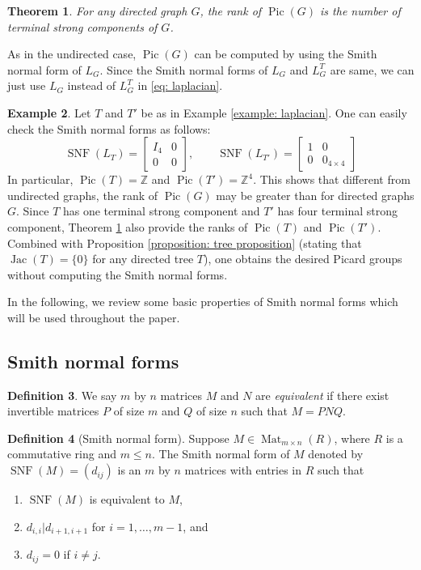\documentclass[11pt,reqno]{amsart}
\DeclareMathOperator{\Pic}{Pic}
\DeclareMathOperator{\Jac}{Jac}
\DeclareMathOperator{\snf}{SNF}
\theoremstyle{definition}
\newtheorem{mydef}{Definition}[section]
\newtheorem{myeg}[mydef]{Example}
\theoremstyle{plain}
\newtheorem{mytheorem}[mydef]{Theorem}
\begin{document}
\begin{mytheorem}\cite[Corollary 3.5]{wagner2000critical} \label{theorem: wagner}
For any directed graph $G$, the rank of $\Pic(G)$ is the number of terminal strong components of $G$. 	
\end{mytheorem}


As in the undirected case, $\Pic(G)$ can be computed by using the Smith normal form of $L_G$. Since the Smith normal forms of $L_G$ and $L_G^T$ are same, we can just use $L_G$ instead of $L_G^T$ in \eqref{eq: laplacian}. 

\begin{myeg}
Let $T$ and $T'$ be as in Example \ref{example: laplacian}. One can easily check the Smith normal forms as follows:
\[
\snf(L_T)=\left[\begin{array}{c|c}
	I_4 & 0 \\ \hline
	0 & 0
\end{array}\right], \qquad \snf(L_{T'})=\left[\begin{array}{c|c}
1 & 0 \\ \hline
0 & 0_{4\times 4}
\end{array}\right]
\]
In particular, $\Pic(T)=\mathbb{Z}$ and $\Pic(T')=\mathbb{Z}^4$. This shows that different from undirected graphs, the rank of $\Pic(G)$ may be greater than for directed graphs $G$. Since $T$ has one terminal strong component and $T'$ has four terminal strong component, Theorem \ref{theorem: wagner} also provide the ranks of $\Pic(T)$ and $\Pic(T')$. Combined with Proposition \ref{proposition: tree proposition} (stating that $\Jac(T)=\{0\}$ for any directed tree $T$), one obtains the desired Picard groups without computing the Smith normal forms. 
\end{myeg}

In the following, we review some basic properties of Smith normal forms which will be used throughout the paper.  


\subsection{Smith normal forms}


\begin{mydef}
We say $m$ by $n$ matrices $M$ and $N$ are \textit{equivalent} if there exist invertible matrices $P$ of size $m$ and $Q$ of size $n$ such that $M = PNQ$.
\end{mydef}

\begin{mydef}[Smith normal form]
Suppose $M \in \operatorname{Mat}_{m \times n}(R)$, where $R$ is a commutative ring and $m \le n$.
The Smith normal form of $M$ denoted by  $\snf(M) = (d_{ij})$ is an $m$ by $n$ matrices with entries in $R$ such that 
\begin{enumerate}
    \item $\snf(M)$ is equivalent to $M$,
    \item $d_{i,i} | d_{i+1,i+1}$ for $i = 1, \dots, m-1$, and
    \item $d_{ij} = 0$ if $i\neq j$. 
\end{enumerate}
\end{mydef}
\end{document}

